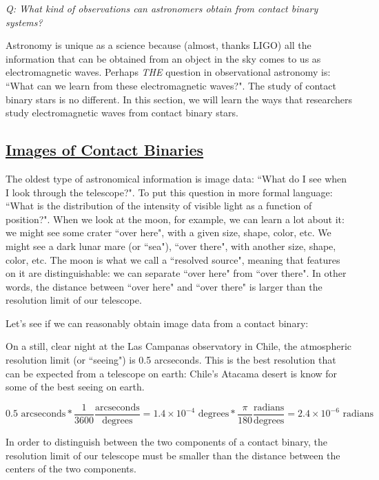\documentclass[12pt]{article} %
\numberwithin{equation}{section} %
\begin{document}
\emph{Q: What kind of observations can astronomers obtain from contact binary systems?}

Astronomy is unique as a science because (almost, thanks LIGO) all the information that can be obtained from an object in the sky comes to us as electromagnetic waves. Perhaps \emph{THE} question in observational astronomy is: ``What can we learn from these electromagnetic waves?". The study of contact binary stars is no different. In this section, we will learn the ways that researchers study electromagnetic waves from contact binary stars.

\subsection[Images of Contact Binaries]{\hyperlink{toc}{Images of Contact Binaries}} \label{sec: Images of Contact Binaries}

The oldest type of astronomical information is image data: ``What do I see when I look through the telescope?". To put this question in more formal language: ``What is the distribution of the intensity of visible light as a function of position?". When we look at the moon, for example, we can learn a lot about it: we might see some crater ``over here", with a given size, shape, color, etc. We might see a dark lunar mare (or ``sea"), ``over there", with another size, shape, color, etc. The moon is what we call a ``resolved source", meaning that features on it are distinguishable: we can separate ``over here" from ``over there". In other words, the distance between ``over here" and ``over there" is larger than the resolution limit of our telescope.

Let's see if we can reasonably obtain image data from a contact binary:

On a still, clear night at the Las Campanas observatory in Chile, the atmospheric resolution limit (or ``seeing") is 0.5 arcseconds. This is the best resolution that can be expected from a telescope on earth: Chile's Atacama desert is know for some of the best seeing on earth.

\begin{equation} \label{eqn: arcseconds}
0.5 \text{ arcseconds} * \frac{1}{3600} \frac{\text{arcseconds}}{\text{degrees}} = 1.4 \times 10^{-4} \text{ degrees} * \frac{\pi}{180} \frac{\text{radians}}{\text{degrees}} = 2.4 \times 10^{-6} \text{ radians}
\end{equation}

In order to distinguish between the two components of a contact binary, the resolution limit of our telescope must be smaller than the distance between the centers of the two components. 
\end{document}
